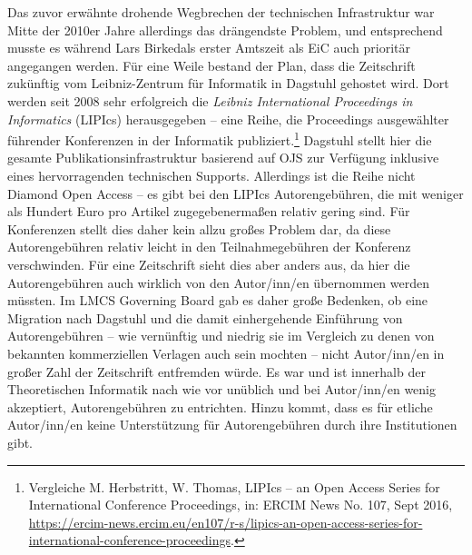 \documentclass[a4paper,
fontsize=11pt,
oneside,
numbers=noperiodatend,
parskip=half-,
bibliography=totoc,
final
]{scrartcl}
\begin{document}
Das zuvor erwähnte drohende Wegbrechen der technischen Infrastruktur war
Mitte der 2010er Jahre allerdings das drängendste Problem, und
entsprechend musste es während Lars Birkedals erster Amtszeit als EiC
auch prioritär angegangen werden. Für eine Weile bestand der Plan, dass
die Zeitschrift zukünftig vom Leibniz-Zentrum für Informatik in Dagstuhl
gehostet wird. Dort werden seit 2008 sehr erfolgreich die \emph{Leibniz
International Proceedings in Informatics} (LIPIcs) herausgegeben -- eine
Reihe, die Proceedings ausgewählter führender Konferenzen in der
Informatik publiziert.\footnote{Vergleiche M. Herbstritt, W. Thomas,
  LIPIcs -- an Open Access Series for International Conference
  Proceedings, in: ERCIM News No. 107, Sept 2016,
  \url{https://ercim-news.ercim.eu/en107/r-s/lipics-an-open-access-series-for-international-conference-proceedings}.}
Dagstuhl stellt hier die gesamte Publikationsinfrastruktur basierend auf
OJS zur Verfügung inklusive eines hervorragenden technischen Supports.
Allerdings ist die Reihe nicht Diamond Open Access -- es gibt bei den
LIPIcs Autorengebühren, die mit weniger als Hundert Euro pro Artikel
zugegebenermaßen relativ gering sind. Für Konferenzen stellt dies daher
kein allzu großes Problem dar, da diese Autorengebühren relativ leicht
in den Teilnahmegebühren der Konferenz verschwinden. Für eine
Zeitschrift sieht dies aber anders aus, da hier die Autorengebühren auch
wirklich von den Autor/inn/en übernommen werden müssten. Im LMCS
Governing Board gab es daher große Bedenken, ob eine Migration nach
Dagstuhl und die damit einhergehende Einführung von Autorengebühren --
wie vernünftig und niedrig sie im Vergleich zu denen von bekannten
kommerziellen Verlagen auch sein mochten -- nicht Autor/inn/en in großer
Zahl der Zeitschrift entfremden würde. Es war und ist innerhalb der
Theoretischen Informatik nach wie vor unüblich und bei Autor/inn/en
wenig akzeptiert, Autorengebühren zu entrichten. Hinzu kommt, dass es
für etliche Autor/inn/en keine Unterstützung für Autorengebühren durch
ihre Institutionen gibt.
\end{document}
